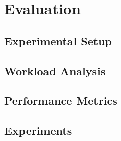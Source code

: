 \section{Evaluation}

\subsection{Experimental Setup}
\subsection{Workload Analysis}
\subsection{Performance Metrics}
\subsection{Experiments}

